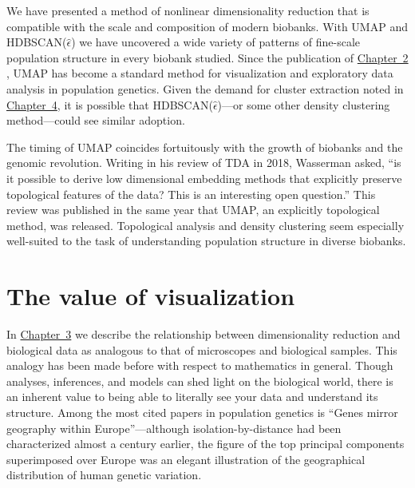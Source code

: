 We have presented a method of nonlinear dimensionality reduction that is compatible with the scale and composition of modern biobanks. With UMAP and HDBSCAN($\hat{\epsilon}$) we have uncovered a wide variety of patterns of fine-scale population structure in every biobank studied. Since the publication of \hyperref[chap:chapter2]{Chapter~2} , UMAP has become a standard method for visualization and exploratory data analysis in population genetics. Given the demand for cluster extraction noted in \hyperref[chap:chapter4]{Chapter~4}, it is possible that HDBSCAN($\hat{\epsilon}$)---or some other density clustering method---could see similar adoption.

The timing of UMAP coincides fortuitously with the growth of biobanks and the genomic revolution. Writing in his review of TDA in 2018, Wasserman asked, ``is it possible to derive low dimensional embedding methods that explicitly preserve topological features of the data? This is an interesting open question.''\citep{wasserman_topological_2018} This review was published in the same year that UMAP, an explicitly topological method, was released. Topological analysis and density clustering seem especially well-suited to the task of understanding population structure in diverse biobanks.

\section{The value of visualization}

In \hyperref[chap:chapter3]{Chapter~3} we describe the relationship between dimensionality reduction and biological data as analogous to that of microscopes and biological samples. This analogy has been made before with respect to mathematics in general\citep{cohen_mathematics_2004}. Though analyses, inferences, and models can shed light on the biological world, there is an inherent value to being able to literally see your data and understand its structure. Among the most cited papers in population genetics is ``Genes mirror geography within Europe''\citep{novembre2008europe}---although isolation-by-distance had been characterized almost a century earlier, the figure of the top principal components superimposed over Europe was an elegant illustration of the geographical distribution of human genetic variation.

